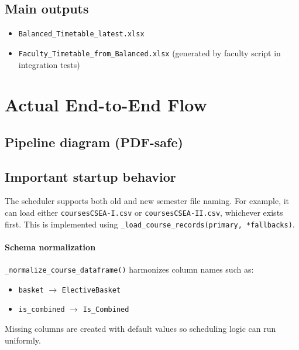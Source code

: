 \documentclass[12pt,a4paper]{article}
\begin{document}
\subsection{Main outputs}
\begin{itemize}[leftmargin=1.2cm]
  \item \texttt{Balanced\_Timetable\_latest.xlsx}
  \item \texttt{Faculty\_Timetable\_from\_Balanced.xlsx} (generated by faculty script in integration tests)
\end{itemize}

\section{Actual End-to-End Flow}

\subsection{Pipeline diagram (PDF-safe)}
\begin{center}
\end{center}

\subsection{Important startup behavior}
The scheduler supports both old and new semester file naming. For example, it can load either \texttt{coursesCSEA-I.csv} or \texttt{coursesCSEA-II.csv}, whichever exists first. This is implemented using \texttt{\_load\_course\_records(primary, *fallbacks)}.

\paragraph{Schema normalization}
\texttt{\_normalize\_course\_dataframe()} harmonizes column names such as:
\begin{itemize}[leftmargin=1.2cm]
  \item \texttt{basket} $\rightarrow$ \texttt{ElectiveBasket}
  \item \texttt{is\_combined} $\rightarrow$ \texttt{Is\_Combined}
\end{itemize}
Missing columns are created with default values so scheduling logic can run uniformly.
\end{document}
